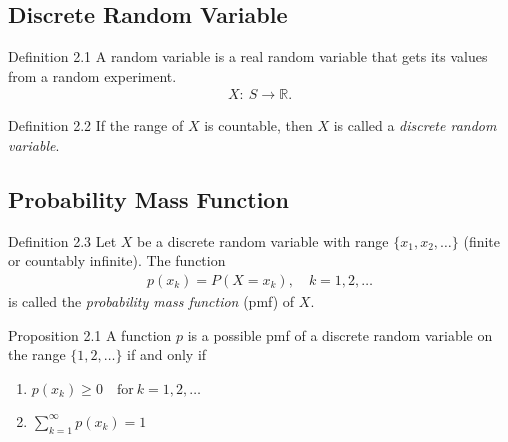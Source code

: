 \subsection{Discrete Random Variable}
\begin{boks}{Definition 2.1}
A random variable is a real random variable that gets its values from a random experiment.
\begin{align*}
    X: \ S \rightarrow \mathbb{R}.
\end{align*}
\end{boks}
\begin{boks}{Definition 2.2}
If the range of $X$ is countable, then $X$ is called a \textit{discrete random variable}.
\end{boks}

\subsection{Probability Mass Function}
\begin{boks}{Definition 2.3}
Let $X$ be a discrete random variable with range $\{x_1, x_2, \ldots\}$ (finite or countably infinite). The function
\begin{align*}
    p(x_k) = P(X = x_k), \quad k = 1,2,\ldots
\end{align*}
is called the \textit{probability mass function} (pmf) of $X$.
\end{boks}

\begin{minipage}{0.7\textwidth}
  \begin{boks}{Proposition 2.1}
  A function $p$ is a possible pmf of a discrete random variable on the range $\{1,2,\ldots\}$ if and only if
  \vspace{5mm}
  \begin{enumerate}
      \item $p(x_k)\geq 0 \quad \text{for} \ k = 1,2,\ldots$
      \item $\sum_{k=1}^\infty p(x_k) = 1$
  \end{enumerate}
  \end{boks}
\end{minipage}

